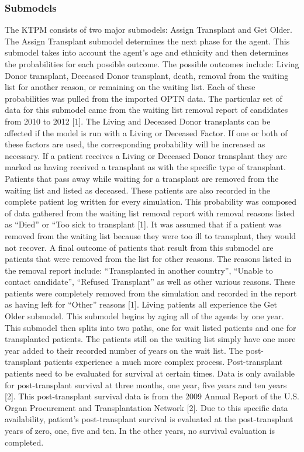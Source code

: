 \documentclass[9pt,a4paper,twocolumn]{scrartcl}
\begin{document}
\subsubsection{Submodels}
The KTPM consists of two major submodels: Assign Transplant and Get Older.
The Assign Transplant submodel determines the next phase for the agent.  This submodel takes into account the agent’s age and ethnicity and then determines the probabilities for each possible outcome.  The possible outcomes include: Living Donor transplant, Deceased Donor transplant, death, removal from the waiting list for another reason, or remaining on the waiting list.  Each of these probabilities was pulled from the imported OPTN data.  The particular set of data for this submodel came from the waiting list removal report of candidates from 2010 to 2012 [1].  The Living and Deceased Donor transplants can be affected if the model is run with a Living or Deceased Factor.  If one or both of these factors are used, the corresponding probability will be increased as necessary.
If a patient receives a Living or Deceased Donor transplant they are marked as having received a transplant as with the specific type of transplant.  Patients that pass away while waiting for a transplant are removed from the waiting list and listed as deceased.  These patients are also recorded in the complete patient log written for every simulation.  This probability was composed of data gathered from the waiting list removal report with removal reasons listed as “Died” or “Too sick to transplant [1].  It was assumed that if a patient was removed from the waiting list because they were too ill to transplant, they would not recover.  
A final outcome of patients that result from this submodel are patients that were removed from the list for other reasons.  The reasons listed in the removal report include: “Transplanted in another country”, “Unable to contact candidate”, “Refused Transplant” as well as other various reasons.  These patients were completely removed from the simulation and recorded in the report as having left for “Other” reasons [1].
Living patients all experience the Get Older submodel.  This submodel begins by aging all of the agents by one year.  This submodel then splits into two paths, one for wait listed patients and one for transplanted patients.  The patients still on the waiting list simply have one more year added to their recorded number of years on the wait list.  The post-transplant patients experience a much more complex process.
Post-transplant patients need to be evaluated for survival at certain times.  Data is only available for post-transplant survival at three months, one year, five years and ten years [2].  This post-transplant survival data is from the 2009 Annual Report of the U.S. Organ Procurement and Transplantation Network [2].  Due to this specific data availability, patient’s post-transplant survival is evaluated at the post-transplant years of zero, one, five and ten.  In the other years, no survival evaluation is completed.  
\end{document}
